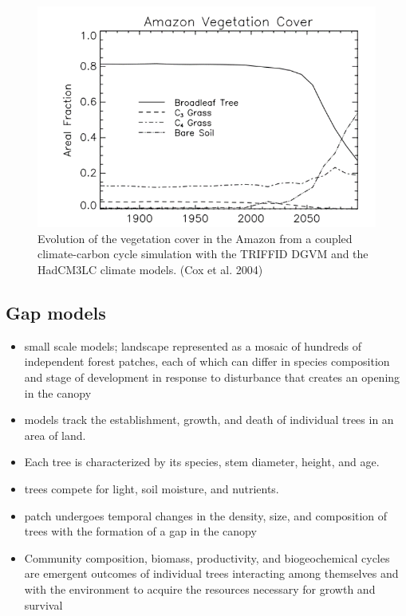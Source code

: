 \documentclass[12pt,oneside]{book}
\providecommand{\tightlist}{%
  \setlength{\itemsep}{0pt}\setlength{\parskip}{0pt}}
\begin{document}
\begin{figure}

{\centering \includegraphics[width=0.8\linewidth]{figures/chap6/f68_amazon_dieback} 

}

\caption{Evolution of the vegetation cover in the Amazon from a coupled climate-carbon cycle simulation with the TRIFFID DGVM and the HadCM3LC climate models. (Cox et al. 2004)}\label{fig:f68}
\end{figure}

\subsection{Gap models}\label{gap-models}

\begin{itemize}
\tightlist
\item
  small scale models; landscape represented as a mosaic of hundreds of
  independent forest patches, each of which can differ in species
  composition and stage of development in response to disturbance that
  creates an opening in the canopy
\item
  models track the establishment, growth, and death of individual trees
  in an area of land.
\item
  Each tree is characterized by its species, stem diameter, height, and
  age.
\item
  trees compete for light, soil moisture, and nutrients.
\item
  patch undergoes temporal changes in the density, size, and composition
  of trees with the formation of a gap in the canopy
\item
  Community composition, biomass, productivity, and biogeochemical
  cycles are emergent outcomes of individual trees interacting among
  themselves and with the environment to acquire the resources necessary
  for growth and survival
\end{itemize}
\end{document}
